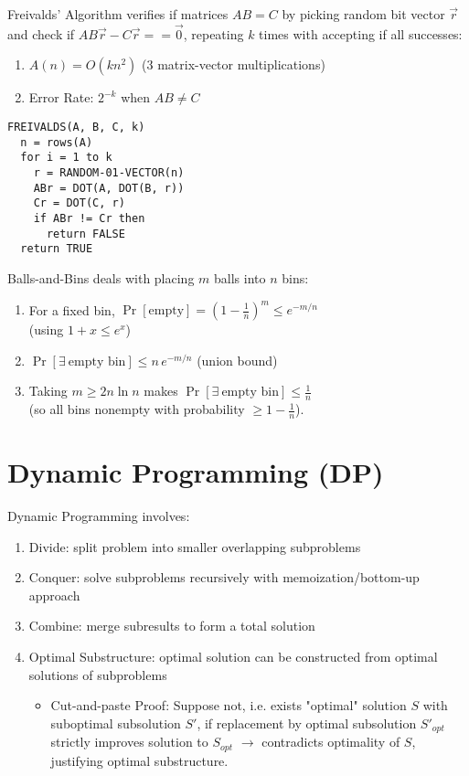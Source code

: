 \documentclass[12pt, a4paper]{article}
\begin{document}
\begin{multicols*}{3}
Freivalds' Algorithm verifies if matrices $AB = C$ by picking random bit vector $\vec{r}$ and check if $AB \vec{r} - C \vec{r} == \vec{0}$, repeating $k$ times with accepting if all successes:
\begin{enumerate}[\roman*.]
  \item $A(n) = O(kn^2)$ (3 matrix-vector multiplications)
  \item Error Rate: $2^{-k}$ when $AB \neq C$
\end{enumerate}
\begin{lstlisting}
FREIVALDS(A, B, C, k)    
  n = rows(A)               
  for i = 1 to k
    r = RANDOM-01-VECTOR(n) 
    ABr = DOT(A, DOT(B, r))
    Cr = DOT(C, r)
    if ABr != Cr then
      return FALSE   
  return TRUE
\end{lstlisting}

Balls-and-Bins deals with placing $m$ balls into $n$ bins:
\begin{enumerate}[\roman*.]
  \item For a fixed bin, $\Pr[\text{empty}]=(1-\tfrac1n)^m \le e^{-m/n}$\\(using $1+x\le e^x$)
  \item $\Pr[\exists\ \text{empty bin}] \le n\,e^{-m/n}$ (union bound) 
  \item Taking $m \ge 2n\ln n$ makes $\Pr[\exists\ \text{empty bin}] \leq \frac{1}{n}$\\(so all bins nonempty with probability $\ge 1-\tfrac1n$).
\end{enumerate}
\vspace{-1em}
\colbreak
\section{Dynamic Programming (DP)} %

Dynamic Programming involves:
\begin{enumerate}[\roman*.]
  \item Divide: split problem into smaller overlapping subproblems
  \item Conquer: solve subproblems recursively with memoization/bottom-up approach
  \item Combine: merge subresults to form a total solution
  \item Optimal Substructure: optimal solution can be constructed from optimal solutions of subproblems
    \begin{itemize}[leftmargin=*]\vspace{3pt}
      \item Cut-and-paste Proof: Suppose not, i.e. exists "optimal" solution $S$ with suboptimal subsolution $S'$, if replacement by optimal subsolution $S'_{opt}$ strictly improves solution to $S_{opt}$ $\rightarrow$ contradicts optimality of $S$, justifying optimal substructure.
    \end{itemize}
\end{enumerate}



\end{multicols*}
\end{document}
